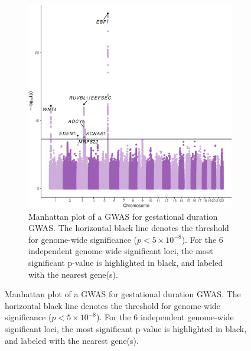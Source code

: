 \begin{figure}
  \centering
    \begin{subfigure}[t]{\textwidth}
    \centering
    \includegraphics[width=\linewidth]{img/FigureS_Manhattan_plot.png}
    \caption{Manhattan plot of a GWAS for gestational duration GWAS. The horizontal black line denotes the threshold for genome-wide significance ($p < 5 \times 10^{-8}$). For the 6 independent genome-wide significant loci, the most significant p-value is highlighted in black, and labeled with the nearest gene(s).}\label{fig:manhattan}
  \end{subfigure}
\end{figure}


